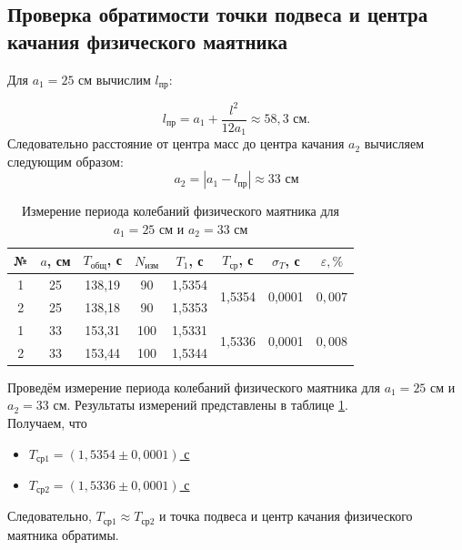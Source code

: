 \documentclass[a4paper,12pt]{article} %
\begin{document}
\subsection{Проверка обратимости точки подвеса и центра качания физического маятника}

Для $ a_1 = 25 $ см вычислим $ l_\text{пр} $:

\begin{equation}
l_\text{пр}=a_1+\frac{l^2}{12a_1}\approx 58,3 \text{ см}.
\end{equation}
Следовательно расстояние от центра масс до центра качания $ a_2 $ вычисляем следующим образом:
\begin{equation}
a_2=\left|a_1-l_\text{пр}\right|\approx 33 \text{ см}
\end{equation}

\begin{table}[h!]
	\begin{center}
		\begin{tabular}{|c|c|c|c|c|c|c|c|}
			\hline
			№ & $ a $, см & $ T_\text{общ} $, с & $ N_\text{изм} $ & $ T_1 $, с  & $ T_\text{ср} $, с               & $ \sigma_T $, с                & $ \varepsilon,\% $                \\ \hline
			1 & 25    & 138,19    & 90         & 1,5354 & \multirow{2}{*}{1,5354} & \multirow{2}{*}{0,0001} & \multirow{2}{*}{$ 0,007$} \\ \cline{1-5}
			2 & 25    & 138,18    & 90         & 1,5353 &                         &                         &                              \\ \hline \hline
			1 & 33    & 153,31    & 100        & 1,5331 & \multirow{2}{*}{1,5336} & \multirow{2}{*}{0,0001} & \multirow{2}{*}{$ 0,008$} \\ \cline{1-5}
			2 & 33    & 153,44    & 100        & 1,5344 &                         &                         &                              \\ \hline
		\end{tabular}
	\end{center}
\caption{Измерение периода колебаний физического маятника для $ a_1=25 $ см и $ a_2=33 $ см}\label{tab5}
\end{table}

Проведём измерение периода колебаний физического маятника для $ a_1=25 $ см и $ a_2=33 $ см. Результаты измерений представлены в таблице \ref{tab5}.\\

Получаем, что
\begin{itemize}
	\item \underline{$ T_{\text{ср}1} = \left( 1,5354\pm0,0001 \right) $ с}
	\item \underline{$ T_{\text{ср}2} = \left( 1,5336\pm0,0001 \right) $ с}
\end{itemize}
Следовательно, $ T_{\text{ср}1} \approx T_{\text{ср}2} $ и точка подвеса и центр качания физического маятника обратимы.
\end{document}
